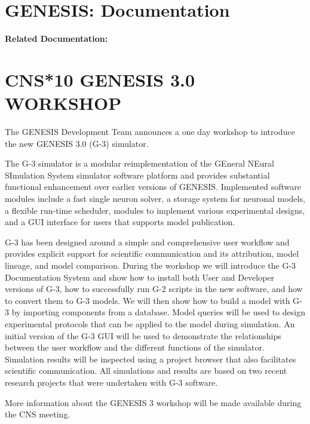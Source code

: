 \documentclass[12pt]{article}
\begin{document}
\section*{GENESIS: Documentation}

{\bf Related Documentation:}

\section*{CNS*10 GENESIS 3.0 WORKSHOP}

The GENESIS Development Team announces a one day
workshop to introduce the new GENESIS 3.0 (G-3) simulator.

The G-3 simulator is a modular reimplementation of the GEneral NEural SImulation System
simulator software platform and provides substantial functional enhancement over earlier versions of GENESIS.
Implemented software modules include a fast single neuron solver, a
storage system for neuronal models, a flexible run-time scheduler,
modules to implement various experimental designs, and a GUI interface for users that supports model publication.

G-3 has been designed around a simple and comprehensive user
workflow and provides explicit support for scientific communication and its attribution, model lineage, and model comparison.
During the workshop we will introduce the G-3 Documentation System and show how to install both User and Developer versions of G-3, how to successfully run G-2
scripts in the new software, and how to convert them to G-3
models.  We will then show how to build a model with G-3 by
importing components from a database.  Model queries will be used to design
experimental protocols that can be applied to the model during
simulation.  An initial version of the G-3 GUI will be used to
demonstrate the relationships between the user workflow and the
different functions of the simulator.  Simulation results will be
inspected using a project browser that also facilitates scientific
communication.  All simulations and results are based on two recent
research projects that were undertaken with G-3 software.

More information about the GENESIS 3 workshop will be made available
during the CNS meeting.
\end{document}
